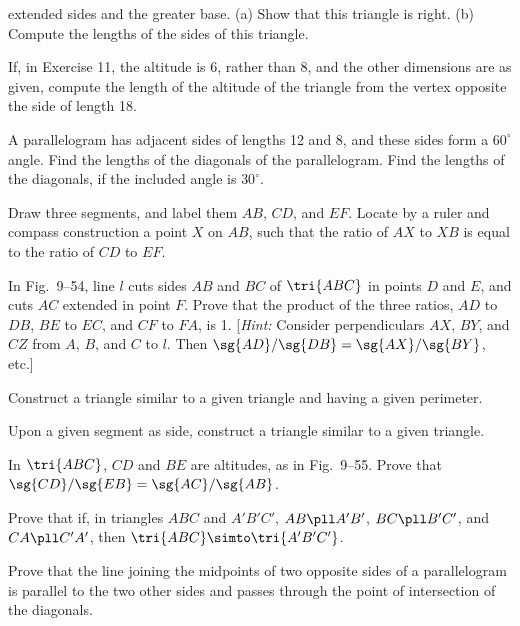 \documentclass[11pt]{book}
\theoremstyle{bkplain}
\theoremstyle{XIplainnote}
\theoremstyle{bkplain}
\theoremstyle{bkplain}
\begin{document}
\begin{exlist}
      extended sides and the greater base. (a) Show that this triangle is right.
      (b) Compute the lengths of the sides of this triangle.
\exfig{\FIGIXFIFTYTHREE}
\item[12.] If, in Exercise 11, the altitude is 6, rather than 8, and the other
      dimensions are as given, compute the length of the altitude of the
      triangle from the vertex opposite the side of length 18.
\item[13.] A parallelogram has adjacent sides of lengths 12 and 8, and these
      sides form a $60^\circ$ angle. Find the lengths of the diagonals of the
      parallelogram. Find the lengths of the diagonals, if the included angle is
      $30^\circ$.
\item[14.] Draw three segments, and label them $AB$, $CD$, and $EF$. Locate by a
      ruler and compass construction a point $X$ on $AB$, such that the ratio of
      $AX$ to $XB$ is equal to the ratio of $CD$ to $EF$.
\item[\stex 15.] In Fig.~9--54, line $l$ cuts sides $AB$ and $BC$ of $\tri{ABC}$
      in points $D$ and $E$, and cuts $AC$ extended in point $F$. Prove that the
      product of the three ratios, $AD$ to $DB$, $BE$ to $EC$, and $CF$ to $FA$,
      is 1. [\emph{Hint:} Consider perpendiculars $AX$, $BY$, and $CZ$ from $A$,
      $B$, and $C$ to $l$. Then $\sg{AD}/\sg{DB} = \sg{AX}/\sg{BY}$, etc.]
\exfig{\FIGIXFIFTYFOUR}
\item[16.] Construct a triangle similar to a given triangle and having a given
      perimeter.
\item[17.] Upon a given segment as side, construct a triangle similar to a given
      triangle.
\item[18.] In $\tri{ABC}$, $CD$ and $BE$ are altitudes, as in Fig.~9--55. Prove
      that $\sg{CD}/\sg{EB} = \sg{AC}/\sg{AB}$.
\exfig{\FIGIXFIFTYFIVE}
\item[19.] Prove that if, in triangles $ABC$ and $A'B'C'$, $AB \pll A'B'$,
      $BC \pll B'C'$, and $CA \pll C'A'$, then $\tri{ABC} \simto \tri{A'B'C'}$.
\item[20.] Prove that the line joining the midpoints of two opposite sides of a
      parallelogram is parallel to the two other sides and passes through the
      point of intersection of the diagonals.
\end{exlist}
\clearpage
\setcounter{theorem}{0}\setcounter{definition}{0}\setcounter{construction}{0}\setcounter{exgroup}{0}\setcounter{footnote}{0}
\setcounter{chapter}{10}
\end{document}
